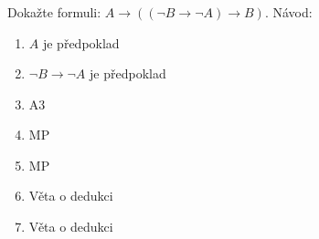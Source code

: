 \subsubsection{}
Dokažte formuli: $A \rightarrow ( (\neg B \rightarrow \neg A) \rightarrow B)$.
Návod:
\begin{enumerate}[1)]
  \item $A$ je předpoklad
  \item $\neg B \rightarrow \neg A$ je předpoklad
  \item A3
  \item MP
  \item MP
  \item Věta o dedukci
  \item Věta o dedukci
\end{enumerate}
